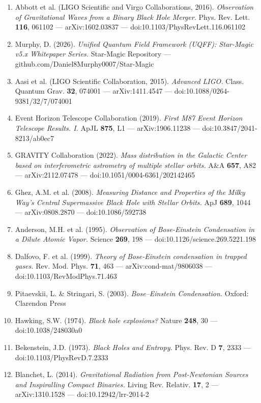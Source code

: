 \documentclass[12pt,a4paper]{article}
\begin{document}
\begin{enumerate}
  \item Abbott et al. (LIGO Scientific and Virgo Collaborations, 2016). \emph{Observation of Gravitational Waves from a Binary Black Hole Merger.} Phys. Rev. Lett. \textbf{116}, 061102 --- arXiv:1602.03837 --- doi:10.1103/PhysRevLett.116.061102
  \item Murphy, D. (2026). \emph{Unified Quantum Field Framework (UQFF): Star-Magic v5.x Whitepaper Series.} Star-Magic Repository --- github.com/Daniel8Murphy0007/Star-Magic
  \item Aasi et al. (LIGO Scientific Collaboration, 2015). \emph{Advanced LIGO.} Class. Quantum Grav. \textbf{32}, 074001 --- arXiv:1411.4547 --- doi:10.1088/0264-9381/32/7/074001
  \item Event Horizon Telescope Collaboration (2019). \emph{First M87 Event Horizon Telescope Results. I.} ApJL \textbf{875}, L1 --- arXiv:1906.11238 --- doi:10.3847/2041-8213/ab0ec7
  \item GRAVITY Collaboration (2022). \emph{Mass distribution in the Galactic Center based on interferometric astrometry of multiple stellar orbits.} A\&A \textbf{657}, A82 --- arXiv:2112.07478 --- doi:10.1051/0004-6361/202142465
  \item Ghez, A.M. et al. (2008). \emph{Measuring Distance and Properties of the Milky Way's Central Supermassive Black Hole with Stellar Orbits.} ApJ \textbf{689}, 1044 --- arXiv:0808.2870 --- doi:10.1086/592738
  \item Anderson, M.H. et al. (1995). \emph{Observation of Bose-Einstein Condensation in a Dilute Atomic Vapor.} Science \textbf{269}, 198 --- doi:10.1126/science.269.5221.198
  \item Dalfovo, F. et al. (1999). \emph{Theory of Bose-Einstein condensation in trapped gases.} Rev. Mod. Phys. \textbf{71}, 463 --- arXiv:cond-mat/9806038 --- doi:10.1103/RevModPhys.71.463
  \item Pitaevskii, L. \& Stringari, S. (2003). \emph{Bose--Einstein Condensation.} Oxford: Clarendon Press
  \item Hawking, S.W. (1974). \emph{Black hole explosions?} Nature \textbf{248}, 30 --- doi:10.1038/248030a0
  \item Bekenstein, J.D. (1973). \emph{Black Holes and Entropy.} Phys. Rev. D \textbf{7}, 2333 --- doi:10.1103/PhysRevD.7.2333
  \item Blanchet, L. (2014). \emph{Gravitational Radiation from Post-Newtonian Sources and Inspiralling Compact Binaries.} Living Rev. Relativ. \textbf{17}, 2 --- arXiv:1310.1528 --- doi:10.12942/lrr-2014-2
\end{enumerate}
\end{document}
